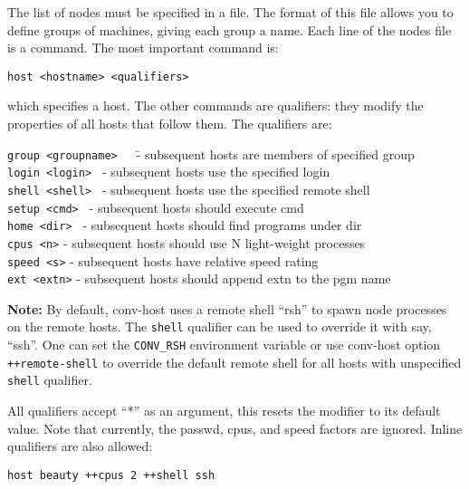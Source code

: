 \begin{itemize}
The list of nodes must be specified in a file.  The format of this file
allows you to define groups of machines, giving each group a name.
Each line of the nodes file is a command.  The most important command
is:

\begin{verbatim}
host <hostname> <qualifiers>
\end{verbatim}

which specifies a host.  The other commands are qualifiers: they modify
the properties of all hosts that follow them.  The qualifiers are:


\begin{tabbing}
{\tt group <groupname>}~~~\= - subsequent hosts are members of specified group\\
{\tt login <login>  }     \> - subsequent hosts use the specified login\\
{\tt shell <shell>  }     \> - subsequent hosts use the specified remote 
shell\\
{\tt setup <cmd>  }       \> - subsequent hosts should execute cmd\\
{\tt home <dir> }         \> - subsequent hosts should find programs under dir\\
{\tt cpus <n>}            \> - subsequent hosts should use N light-weight processes\\
{\tt speed <s>}           \> - subsequent hosts have relative speed rating\\
{\tt ext <extn>}          \> - subsequent hosts should append extn to the pgm name\\
\end{tabbing}

{\bf Note:}
By default, conv-host uses a remote shell ``rsh'' to spawn node processes
on the remote hosts. The {\tt shell} qualifier can be used to override
it with say, ``ssh''. One can set the {\tt CONV\_RSH} environment variable
or use conv-host option {\tt ++remote-shell} to override the default remote 
shell for all hosts with unspecified {\tt shell} qualifier.

All qualifiers accept ``*'' as an argument, this resets the modifier to
its default value.  Note that currently, the passwd, cpus, and speed
factors are ignored.  Inline qualifiers are also allowed:

\begin{verbatim}
host beauty ++cpus 2 ++shell ssh
\end{verbatim}


\end{itemize}
